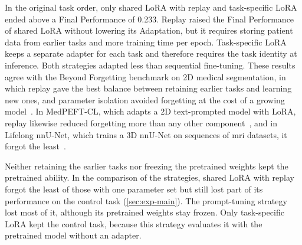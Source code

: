 In the original task order, only shared LoRA with replay and task-specific LoRA ended above a Final Performance of 0.233.
Replay raised the Final Performance of shared LoRA without lowering its Adaptation, but it requires storing patient data from earlier tasks and more training time per epoch.
Task-specific LoRA keeps a separate adapter for each task and therefore requires the task identity at inference.
Both strategies adapted less than sequential fine-tuning.
These results agree with the Beyond Forgetting benchmark on 2D medical segmentation, in which replay gave the best balance between retaining earlier tasks and learning new ones, and parameter isolation avoided forgetting at the cost of a growing model~\cite[Sec.~5]{wang2026beyondforgetting}.
In MedPEFT-CL, which adapts a 2D text-prompted model with LoRA, replay likewise reduced forgetting more than any other component~\cite[Table~8]{gao2026medpeftcl}, and in Lifelong nnU-Net, which trains a 3D nnU-Net on sequences of \gls{mri} datasets, it forgot the least~\cite{gonzalez2023lifelong}.

Neither retaining the earlier tasks nor freezing the pretrained weights kept the pretrained ability.
In the comparison of the strategies, shared LoRA with replay forgot the least of those with one parameter set but still lost part of its performance on the control task (\cref{sec:exp-main}).
The prompt-tuning strategy lost most of it, although its pretrained weights stay frozen.
Only task-specific LoRA kept the control task, because this strategy evaluates it with the pretrained model without an adapter.

